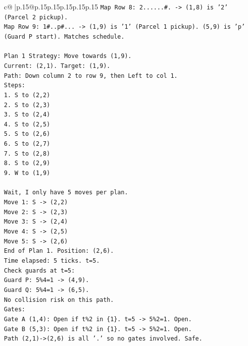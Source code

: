 \documentclass{article}
\begin{document}
{\begin{supertabular}{c@{$\;$}|p{.15\linewidth}@{}p{.15\linewidth}p{.15\linewidth}p{.15\linewidth}p{.15\linewidth}p{.15\linewidth}}
{{{\texttt{Map Row 8: 2......\#. {-}> (1,8) is '2' (Parcel 2 pickup).} \\
\texttt{Map Row 9: 1\#..p\#... {-}> (1,9) is '1' (Parcel 1 pickup). (5,9) is 'p' (Guard P start). Matches schedule.} \\
\\ 
\texttt{Plan 1 Strategy: Move towards (1,9).} \\
\texttt{Current: (2,1). Target: (1,9).} \\
\texttt{Path: Down column 2 to row 9, then Left to col 1.} \\
\texttt{Steps:} \\
\texttt{1. S to (2,2)} \\
\texttt{2. S to (2,3)} \\
\texttt{3. S to (2,4)} \\
\texttt{4. S to (2,5)} \\
\texttt{5. S to (2,6)} \\
\texttt{6. S to (2,7)} \\
\texttt{7. S to (2,8)} \\
\texttt{8. S to (2,9)} \\
\texttt{9. W to (1,9)} \\
\\ 
\texttt{Wait, I only have 5 moves per plan.} \\
\texttt{Move 1: S {-}> (2,2)} \\
\texttt{Move 2: S {-}> (2,3)} \\
\texttt{Move 3: S {-}> (2,4)} \\
\texttt{Move 4: S {-}> (2,5)} \\
\texttt{Move 5: S {-}> (2,6)} \\
\texttt{End of Plan 1. Position: (2,6).} \\
\texttt{Time elapsed: 5 ticks. t=5.} \\
\texttt{Check guards at t=5:} \\
\texttt{Guard P: 5\%4=1 {-}> (4,9).} \\
\texttt{Guard Q: 5\%4=1 {-}> (6,5).} \\
\texttt{No collision risk on this path.} \\
\texttt{Gates:} \\
\texttt{Gate A (1,4): Open if t\%2 in \{1\}. t=5 {-}> 5\%2=1. Open.} \\
\texttt{Gate B (5,3): Open if t\%2 in \{1\}. t=5 {-}> 5\%2=1. Open.} \\
\texttt{Path (2,1){-}>(2,6) is all '.' so no gates involved. Safe.} \\
}}}
\end{supertabular}}
\end{document}
